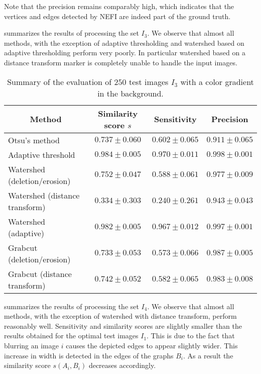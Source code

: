 		Note that the precision remains comparably high, which indicates that the vertices and edges detected by NEFI are indeed part of the ground truth.

		 summarizes the results of processing the set $I_3$. We observe that almost all methods, with the exception of adaptive thresholding and watershed based on adaptive thresholding perform very poorly. In particular watershed based on a distance transform marker is completely unable to handle the input images.

		\begin{table}
			\centering
			\begin{tabular}{@{} l *3c @{}}
			\toprule
			\multicolumn{1}{c}{Method}    & Similarity score $s$  & Sensitivity  & Precision \\ 
			\midrule
			Otsu's method                   & $0.737 \pm 0.060$ & $0.602 \pm 0.065$ & $0.911 \pm 0.065$ \\
			Adaptive threshold              & $0.984 \pm 0.005$ & $0.970 \pm 0.011$ & $0.998 \pm 0.001$ \\
			Watershed (deletion/erosion)    & $0.752 \pm 0.047$ & $0.588 \pm 0.061$ & $0.977 \pm 0.009$ \\
			Watershed (distance transform)  & $0.334 \pm 0.303$ & $0.240 \pm 0.261$ & $0.943 \pm 0.043$ \\
			Watershed (adaptive)            & $0.982 \pm 0.005$ & $0.967 \pm 0.012$ & $0.997 \pm 0.001$ \\
			Grabcut (deletion/erosion)      & $0.733 \pm 0.053$ & $0.573 \pm 0.066$ & $0.987 \pm 0.005$ \\
			Grabcut (distance transform)    & $0.742 \pm 0.052$ & $0.582 \pm 0.065$ & $0.983 \pm 0.008$ \\
			\bottomrule
			\end{tabular}
			\caption[NEFI's evaluation: Images with background color gradient]{Summary of the evaluation of $250$ test images $I_3$ with a color gradient in the background.}
			\label{tab:background_gradient}
		\end{table}

		 summarizes the results of processing the set $I_4$. We observe that almost all methods, with the exception of watershed with distance transform, perform reasonably well. Sensitivity and similarity scores are slightly smaller than the results obtained for the optimal test images $I_1$. This is due to the fact that blurring an image $i$ causes the depicted edges to appear slightly wider. This increase in width is detected in the edges of the graphs $B_i$. As a result the similarity score $s(A_i,B_i)$ decreases accordingly.

